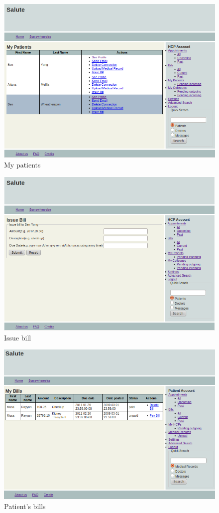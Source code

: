 \begin{figure}
\includegraphics[scale=0.6]{screenshots/my_patients.png}
\caption{My patients}
\end{figure}

\begin{figure}
\includegraphics[scale=0.6]{screenshots/issuebill.png}
\caption{Issue bill}
\end{figure}

\begin{figure}
\includegraphics[scale=0.6]{screenshots/patient_bills.png}
\caption{Patient's bills}
\end{figure}

